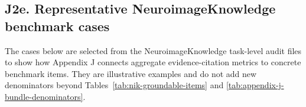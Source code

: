 
\subsection{\texorpdfstring{\textbf{J2e. Representative NeuroimageKnowledge benchmark cases}}{J2e. Representative NeuroimageKnowledge benchmark cases}}\label{j2e.-representative-benchmark-cases-from-the-unified-bundle}

The cases below are selected from the NeuroimageKnowledge task-level audit files to show how Appendix J connects aggregate evidence-citation metrics to concrete benchmark items. They are illustrative examples and do not add new denominators beyond Tables~\ref{tab:nik-groundable-items} and \ref{tab:appendix-j-bundle-denominators}.

